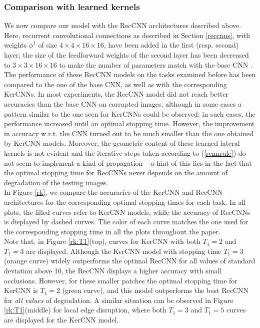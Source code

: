 \documentclass[11pt,oneside,reqno]{amsart}
\begin{document}
 \subsubsection{Comparison with learned kernels}\label{cfr}
 We now compare our model with the RecCNN architectures described above. Here, recurrent convolutional connections as described in Section \ref{reccnns}, with weights $\phi^1$ of size $4\times 4 \times 16 \times 16$, have been added in the first (resp. second) layer; the size of the feedforward weights of the second layer has been decreased to $3 \times 3 \times 16 \times 16$ to make the number of parameters match with the base CNN \citep[as in][]{spoerer}. The performance of these RecCNN models on the tasks examined before has been compared to the one of the base CNN, as well as with the corresponding KerCNNs. In most experiments, the RecCNN model did not reach better accuracies than the base CNN on corrupted images, although in some cases a pattern similar to the one seen for KerCNNs could be observed: in such cases, the performance increased until an optimal stopping time. However, the improvement in accuracy w.r.t. the CNN turned out to be much smaller than the one obtained by KerCNN models. Moreover, the geometric content of these learned lateral kernels is not evident and the iterative steps taken according to (\ref{rcnnrule}) do not seem to implement a kind of propagation -- a hint of this lies in the fact that the optimal stopping time for RecCNNs never depends on the amount of degradation of the testing images.\\
 In Figure \ref{rk}, we compare the accuracies of the KerCNN and RecCNN architectures for the corresponding optimal stopping times for each task. In all plots, the filled curves refer to KerCNN models, while the accuracy of RecCNNs is displayed by dashed curves. The color of each curve matches the one used for the corresponding stopping time in all the plots throughout the paper.\\
 Note that, in Figure \ref{rk:T1}(top), curves for KerCNN with both $T_1=2$ and $T_1=3$ are displayed. Although the KerCNN model with stopping time $T_1=3$ (orange curve) widely outperforms the optimal RecCNN for all values of standard deviation above 10, the RecCNN displays a higher accuracy with small occlusions. However, for these smaller patches the optimal stopping time for KerCNN is $T_1=2$ (green curve), and this model outperforms the best RecCNN for \emph{all values} of degradation. A similar situation can be observed in Figure \ref{rk:T1}(middle) for local edge disruption, where  both $T_1=3$ and $T_1=5$ curves are displayed for the KerCNN model.\\
\end{document}
